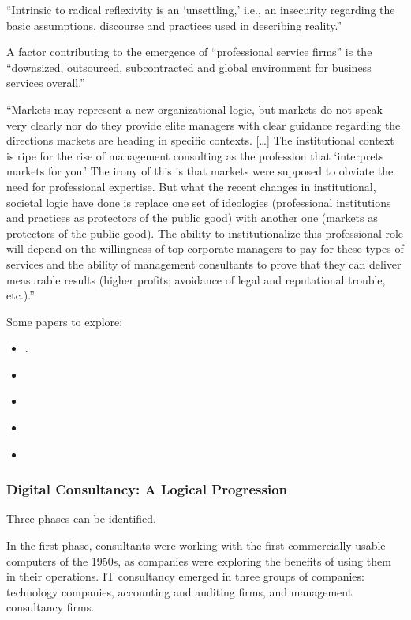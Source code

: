 \documentclass[12pt]{article}
\providecommand{\tightlist}{%
  \setlength{\itemsep}{0pt}\setlength{\parskip}{0pt}}
\begin{document}
``Intrinsic to radical reflexivity is an `unsettling,' i.e., an
insecurity regarding the basic assumptions, discourse and practices used
in describing reality.'' \citep[ 370]{pollner1991}

A factor contributing to the emergence of ``professional service firms''
is the ``downsized, outsourced, subcontracted and global environment for
business services overall.'' \citep[ 17]{leicht2006}

``Markets may represent a new organizational logic, but markets do not
speak very clearly nor do they provide elite managers with clear
guidance regarding the directions markets are heading in specific
contexts. {[}\ldots{]} The institutional context is ripe for the rise of
management consulting as the profession that `interprets markets for
you.' The irony of this is that markets were supposed to obviate the
need for professional expertise. But what the recent changes in
institutional, societal logic have done is replace one set of ideologies
(professional institutions and practices as protectors of the public
good) with another one (markets as protectors of the public good). The
ability to institutionalize this professional role will depend on the
willingness of top corporate managers to pay for these types of services
and the ability of management consultants to prove that they can deliver
measurable results (higher profits; avoidance of legal and reputational
trouble, etc.).'' \citep[ 37]{leicht2006}

Some papers to explore:

\begin{itemize}
\tightlist
\item
  \citep[ 120-130]{armbruster2006}.
\item
  \citep{kipping2003}
\item
  \citep{kipping2012}
\item
  \citep[ 336]{fincham1999}
\item
  \citep{mckenna2006}
\end{itemize}

\hypertarget{digital-consultancy-a-logical-progression}{%
\subsubsection{Digital Consultancy: A Logical
Progression}\label{digital-consultancy-a-logical-progression}}

Three phases can be identified.

In the first phase, consultants were working with the first commercially
usable computers of the 1950s, as companies were exploring the benefits
of using them in their operations. IT consultancy emerged in three
groups of companies: technology companies, accounting and auditing
firms, and management consultancy firms. \citep[ 162]{kipping2012}
\end{document}
